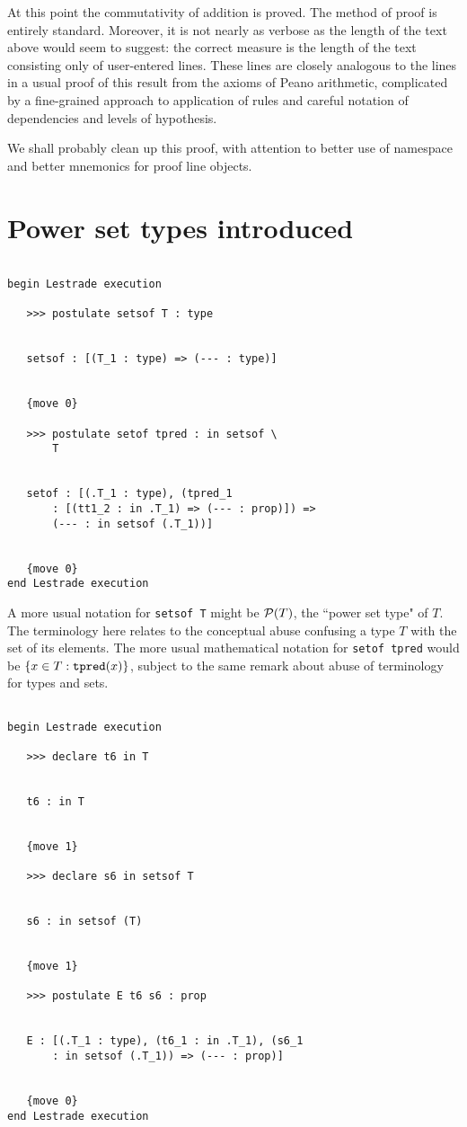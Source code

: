 \documentclass[12pt]{article}
\begin{document}
At this point the commutativity of addition is proved.  The method of proof is entirely standard.  Moreover, it is not nearly as verbose as the length of the text above would seem to suggest:  the correct measure is the length of the text consisting only of user-entered lines.  These lines are closely analogous to the lines in a usual proof of this result from the axioms of Peano arithmetic, complicated by a fine-grained approach to application of rules and careful notation of dependencies and levels of hypothesis.

We shall probably clean up this proof, with attention to better use of namespace and better mnemonics for proof line objects.

\section{Power set types introduced}

\begin{verbatim}

begin Lestrade execution

   >>> postulate setsof T : type


   setsof : [(T_1 : type) => (--- : type)]


   {move 0}

   >>> postulate setof tpred : in setsof \
       T


   setof : [(.T_1 : type), (tpred_1 
       : [(tt1_2 : in .T_1) => (--- : prop)]) => 
       (--- : in setsof (.T_1))]


   {move 0}
end Lestrade execution
\end{verbatim}

A more usual notation for {\tt setsof T} might be ${\cal P}(T)$, the ``power set type" of $T$.  The terminology here relates to the conceptual abuse confusing a type $T$ with the set of its elements.  The more usual mathematical notation for {\tt setof tpred} would be $\{x \in T:{\tt tpred}(x)\}$, subject to the same remark about abuse of terminology for types and sets.

\begin{verbatim}

begin Lestrade execution

   >>> declare t6 in T


   t6 : in T


   {move 1}

   >>> declare s6 in setsof T


   s6 : in setsof (T)


   {move 1}

   >>> postulate E t6 s6 : prop


   E : [(.T_1 : type), (t6_1 : in .T_1), (s6_1 
       : in setsof (.T_1)) => (--- : prop)]


   {move 0}
end Lestrade execution
\end{verbatim}
\end{document}

